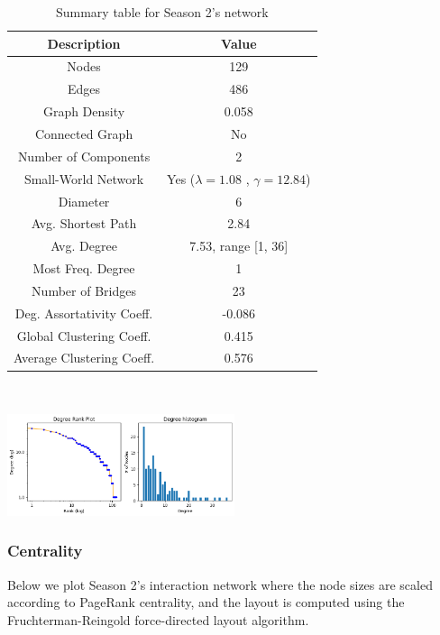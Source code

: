 \documentclass[10pt,twocolumn,letterpaper]{article}
\begin{document}
\begin{table}[!h]
    \centering
    \small
    \begin{tabular}{c|c}
        Description & Value  \\
        \hline
        Nodes & 129 \\
        Edges & 486 \\
        Graph Density & 0.058 \\
        Connected Graph & No \\
        Number of Components & 2 \\
        Small-World Network & Yes ($\lambda=1.08$ , $\gamma=12.84$) \\
        Diameter & 6 \\
        Avg. Shortest Path & 2.84 \\
        Avg. Degree & 7.53, range [1, 36] \\
        Most Freq. Degree & 1 \\
        Number of Bridges & 23 \\
        Deg. Assortativity Coeff. & -0.086\\
        Global Clustering Coeff. & 0.415 \\
        Average Clustering Coeff. & 0.576 \\
        \hline 
    \end{tabular}
    \vspace{0.2cm}
    \caption{Summary table for Season 2's network}
    \label{tab:my_label}
\end{table} \\

\begin{center}
    \includegraphics[width=0.5\textwidth]{img/s2/degree_plot.jpg}
\end{center}

\subsubsection{Centrality}

Below we plot Season 2's interaction network where the node sizes are scaled according to PageRank centrality, and the layout is computed using the Fruchterman-Reingold force-directed layout algorithm.
\end{document}
